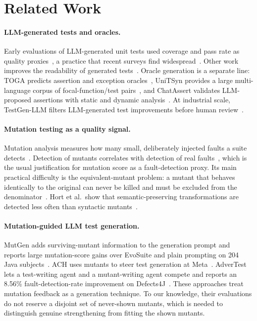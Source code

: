 \documentclass[runningheads]{llncs}
\begin{document}
\section{Related Work}\label{sec:related}

\paragraph{LLM-generated tests and oracles.}
Early evaluations of LLM-generated unit tests used coverage and pass rate as quality proxies~\cite{schafer2024empirical}, a practice that recent surveys find widespread~\cite{rehan2025harnessing}. Other work improves the readability of generated tests~\cite{deljouyi2025understandability}. Oracle generation is a separate line: TOGA predicts assertion and exception oracles~\cite{dinella2022toga}, UniTSyn provides a large multi-language corpus of focal-function/test pairs~\cite{he2024unitsyn}, and ChatAssert validates LLM-proposed assertions with static and dynamic analysis~\cite{hayet2025chatassert}. At industrial scale, TestGen-LLM filters LLM-generated test improvements before human review~\cite{alshahwan2024testgen}.

\paragraph{Mutation testing as a quality signal.}
Mutation analysis measures how many small, deliberately injected faults a suite detects~\cite{jia2011mutation,papadakis2019mutation}. Detection of mutants correlates with detection of real faults~\cite{just2014mutants}, which is the usual justification for mutation score as a fault-detection proxy. Its main practical difficulty is the equivalent-mutant problem: a mutant that behaves identically to the original can never be killed and must be excluded from the denominator~\cite{jia2011mutation,papadakis2019mutation}. Hort et al.\ show that semantic-preserving transformations are detected less often than syntactic mutants~\cite{hort2025semantic}.

\paragraph{Mutation-guided LLM test generation.}
MutGen adds surviving-mutant information to the generation prompt and reports large mutation-score gains over EvoSuite and plain prompting on 204 Java subjects~\cite{wang2025mutgen}. ACH uses mutants to steer test generation at Meta~\cite{foster2025ach}. AdverTest lets a test-writing agent and a mutant-writing agent compete and reports an 8.56\% fault-detection-rate improvement on Defects4J~\cite{chang2026advertest}. These approaches treat mutation feedback as a generation technique. To our knowledge, their evaluations do not reserve a disjoint set of never-shown mutants, which is needed to distinguish genuine strengthening from fitting the shown mutants.
\end{document}
